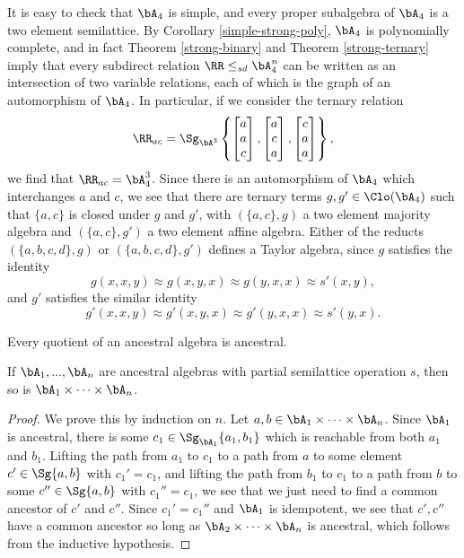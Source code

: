 \begin{ex}
It is easy to check that $\bA_4$ is simple, and every proper subalgebra of $\bA_4$ is a two element semilattice. By Corollary \ref{simple-strong-poly}, $\bA_4$ is polynomially complete, and in fact Theorem \ref{strong-binary} and Theorem \ref{strong-ternary} imply that every subdirect relation $\RR \le_{sd} \bA_4^n$ can be written as an intersection of two variable relations, each of which is the graph of an automorphism of $\bA_4$. In particular, if we consider the ternary relation
\[
\RR_{ac} = \Sg_{\bA^3}\left\{\begin{bmatrix}a\\ a\\ c\end{bmatrix}, \begin{bmatrix}a\\ c\\ a\end{bmatrix}, \begin{bmatrix}c\\ a\\ a\end{bmatrix}\right\},
\]
we find that $\RR_{ac} = \bA_4^3$. Since there is an automorphism of $\bA_4$ which interchanges $a$ and $c$, we see that there are ternary terms $g, g' \in \Clo(\bA_4)$ such that $\{a,c\}$ is closed under $g$ and $g'$, with $(\{a,c\},g)$ a two element majority algebra and $(\{a,c\}, g')$ a two element affine algebra. Either of the reducts $(\{a,b,c,d\},g)$ or $(\{a,b,c,d\},g')$ defines a Taylor algebra, since $g$ satisfies the identity
\[
g(x,x,y) \approx g(x,y,x) \approx g(y,x,x) \approx s'(x,y),
\]
and $g'$ satisfies the similar identity
\[
g'(x,x,y) \approx g'(x,y,x) \approx g'(y,x,x) \approx s'(y,x).
\]
\end{ex}

\begin{prop} Every quotient of an ancestral algebra is ancestral.
\end{prop}

\begin{thm} If $\bA_1, ..., \bA_n$ are ancestral algebras with partial semilattice operation $s$, then so is $\bA_1 \times \cdots \times \bA_n$.
\end{thm}
\begin{proof} We prove this by induction on $n$. Let $a,b \in \bA_1 \times \cdots \times \bA_n$. Since $\bA_1$ is ancestral, there is some $c_1 \in \Sg_{\bA_1}\{a_1,b_1\}$ which is reachable from both $a_1$ and $b_1$. Lifting the path from $a_1$ to $c_1$ to a path from $a$ to some element $c' \in \Sg\{a,b\}$ with $c_1' = c_1$, and lifting the path from $b_1$ to $c_1$ to a path from $b$ to some $c'' \in \Sg\{a,b\}$ with $c_1'' = c_1$, we see that we just need to find a common ancestor of $c'$ and $c''$. Since $c_1' = c_1''$ and $\bA_1$ is idempotent, we see that $c',c''$ have a common ancestor so long as $\bA_2 \times \cdots \times \bA_n$ is ancestral, which follows from the inductive hypothesis.
\end{proof}

